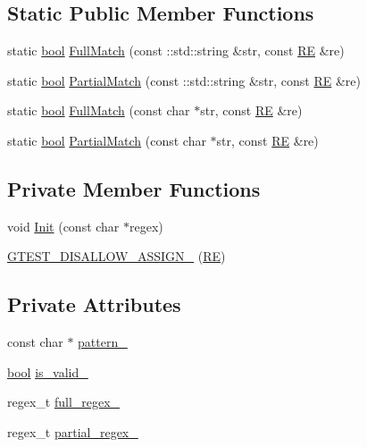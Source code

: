 \subsection*{Static Public Member Functions}
\begin{DoxyCompactItemize}
\item 
static \hyperlink{classbool}{bool} \hyperlink{classtesting_1_1internal_1_1RE_aa79a950758d0f1d62f7762d1e9cefe86}{Full\+Match} (const \+::std\+::string \&str, const \hyperlink{classtesting_1_1internal_1_1RE}{RE} \&re)
\item 
static \hyperlink{classbool}{bool} \hyperlink{classtesting_1_1internal_1_1RE_a1e81f9a87211bdca645e025f8f0236c8}{Partial\+Match} (const \+::std\+::string \&str, const \hyperlink{classtesting_1_1internal_1_1RE}{RE} \&re)
\item 
static \hyperlink{classbool}{bool} \hyperlink{classtesting_1_1internal_1_1RE_a2b13ec1f6ccd6c32f7efa01e21588f0b}{Full\+Match} (const char $\ast$str, const \hyperlink{classtesting_1_1internal_1_1RE}{RE} \&re)
\item 
static \hyperlink{classbool}{bool} \hyperlink{classtesting_1_1internal_1_1RE_a97495dd4c2bb9589522823f060c8e8ba}{Partial\+Match} (const char $\ast$str, const \hyperlink{classtesting_1_1internal_1_1RE}{RE} \&re)
\end{DoxyCompactItemize}
\subsection*{Private Member Functions}
\begin{DoxyCompactItemize}
\item 
void \hyperlink{classtesting_1_1internal_1_1RE_a4c3a519ce849abc57d6d5fffbf1e04dc}{Init} (const char $\ast$regex)
\item 
\hyperlink{classtesting_1_1internal_1_1RE_a6a07573fee776f88fe045d067dbebe18}{G\+T\+E\+S\+T\+\_\+\+D\+I\+S\+A\+L\+L\+O\+W\+\_\+\+A\+S\+S\+I\+G\+N\+\_\+} (\hyperlink{classtesting_1_1internal_1_1RE}{RE})
\end{DoxyCompactItemize}
\subsection*{Private Attributes}
\begin{DoxyCompactItemize}
\item 
const char $\ast$ \hyperlink{classtesting_1_1internal_1_1RE_a44ab32241fab42db5b6f7482776658ec}{pattern\+\_\+}
\item 
\hyperlink{classbool}{bool} \hyperlink{classtesting_1_1internal_1_1RE_af9062fefab96529ff785f50097416d64}{is\+\_\+valid\+\_\+}
\item 
regex\+\_\+t \hyperlink{classtesting_1_1internal_1_1RE_a1627cf3c6e38a83518e7aefd659b938b}{full\+\_\+regex\+\_\+}
\item 
regex\+\_\+t \hyperlink{classtesting_1_1internal_1_1RE_a1b3e42916c61db479ae90c7a96c22a58}{partial\+\_\+regex\+\_\+}
\end{DoxyCompactItemize}


